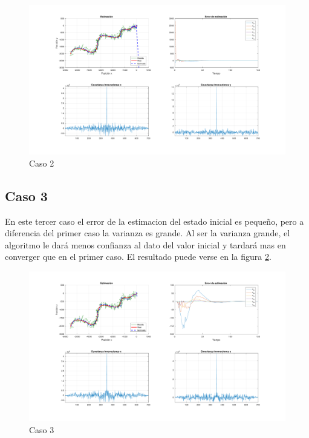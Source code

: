 		\begin{figure}[H]
			\centering
			\includegraphics[width=1.0\textwidth,keepaspectratio]{Figuras/graf_ej3b.pdf}
			\caption{Caso 2}
			\label{fig:ej3b}
		\end{figure}
	
	\subsection{Caso 3}
	
	En este tercer caso el error de la estimacion del estado inicial es pequeño, pero a diferencia del primer caso la varianza es grande. Al ser la varianza grande, el algoritmo le dará menos confianza al dato del valor inicial y tardará mas en converger que en el primer caso. El resultado puede verse en la figura \ref{fig:ej3c}.
	
		\begin{figure}[H]
			\centering
			\includegraphics[width=1.0\textwidth,keepaspectratio]{Figuras/graf_ej3c.pdf}
			\caption{Caso 3}
			\label{fig:ej3c}
		\end{figure}
	
